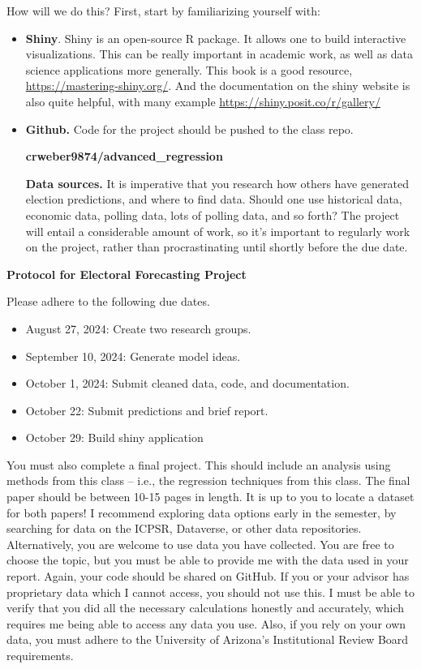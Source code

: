 \documentclass[
]{book}
\begin{document}
How will we do this? First, start by familiarizing yourself with:

\begin{itemize}
\item
  \textbf{Shiny}. Shiny is an open-source R package. It allows one to build interactive visualizations. This can be really important in academic work, as well as data science applications more generally. This book is a good resource, \hyperref[0]{https://mastering-shiny.org/}. And the documentation on the shiny website is also quite helpful, with many example \hyperref[0]{https://shiny.posit.co/r/gallery/}
\item
  \textbf{Github.} Code for the project should be pushed to the class repo.

  \textbf{crweber9874/advanced\_regression}

  \textbf{Data sources.} It is imperative that you research how others have generated election predictions, and where to find data. Should one use historical data, economic data, polling data, lots of polling data, and so forth? The project will entail a considerable amount of work, so it's important to regularly work on the project, rather than procrastinating until shortly before the due date.
\end{itemize}

\textbf{Protocol for Electoral Forecasting Project}

Please adhere to the following due dates.

\begin{itemize}
\item
  August 27, 2024: Create two research groups.
\item
  September 10, 2024: Generate model ideas.
\item
  October 1, 2024: Submit cleaned data, code, and documentation.
\item
  October 22: Submit predictions and brief report.
\item
  October 29: Build shiny application
\end{itemize}

You must also complete a final project. This should include an analysis using methods from this class -- i.e., the regression techniques from this class. The final paper should be between 10-15 pages in length. It is up to you to locate a dataset for both papers! I recommend exploring data options early in the semester, by searching for data on the ICPSR, Dataverse, or other data repositories. Alternatively, you are welcome to use data you have collected. You are free to choose the topic, but you must be able to provide me with the data used in your report. Again, your code should be shared on GitHub. If you or your advisor has proprietary data which I cannot access, you should not use this. I must be able to verify that you did all the necessary calculations honestly and accurately, which requires me being able to access any data you use. Also, if you rely on your own data, you must adhere to the University of Arizona's Institutional Review Board requirements.
\end{document}
